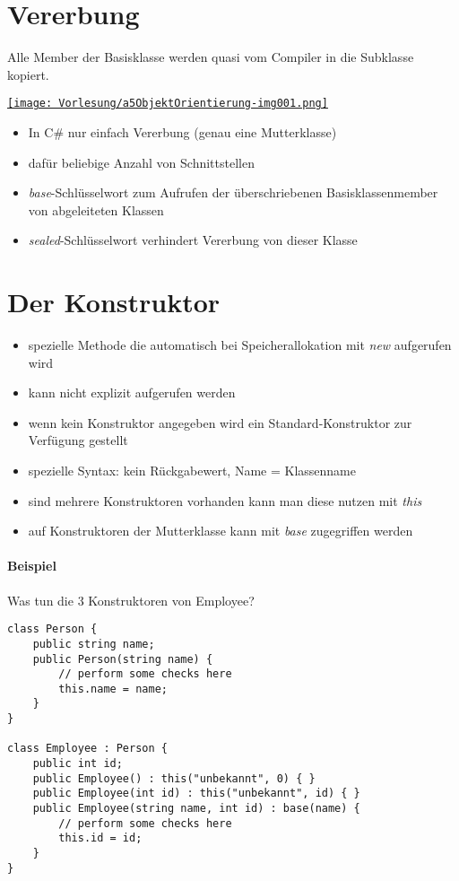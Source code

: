 \section{Vererbung}
Alle Member der Basisklasse werden quasi vom Compiler in die Subklasse kopiert.

\begin{center}
\href{https://commons.wikimedia.org/w/index.php?curid=6326887}{\texttt{[image: Vorlesung/a5ObjektOrientierung-img001.png]}}
\end{center}

\begin{itemize}
\item In C\# nur einfach Vererbung (genau eine Mutterklasse)
\item dafür beliebige Anzahl von Schnittstellen
\item \emph{base}-Schlüsselwort zum Aufrufen der überschriebenen Basisklassenmember von abgeleiteten Klassen
\item \emph{sealed}-Schlüsselwort verhindert Vererbung von dieser Klasse
\end{itemize}

\section{Der Konstruktor}

\begin{itemize}
\item spezielle Methode die automatisch bei Speicherallokation mit \emph{new} aufgerufen wird
\item kann nicht explizit aufgerufen werden
\item wenn kein Konstruktor angegeben wird ein Standard-Konstruktor zur Verfügung gestellt 
\item spezielle Syntax: kein Rückgabewert, Name = Klassenname
\end{itemize}\bigskip
\begin{itemize}
\item sind mehrere Konstruktoren vorhanden kann man diese nutzen mit \emph{this}
\item auf Konstruktoren der Mutterklasse kann mit \emph{base} zugegriffen werden
\end{itemize}

\paragraph{Beispiel} Was tun die 3 Konstruktoren von Employee? 
\begin{lstlisting}[language={[Sharp]C}]
class Person {
	public string name;
	public Person(string name) {
		// perform some checks here 
		this.name = name;
	}
}

class Employee : Person {
	public int id;
	public Employee() : this("unbekannt", 0) { }
	public Employee(int id) : this("unbekannt", id) { }  
	public Employee(string name, int id) : base(name) {
		// perform some checks here
		this.id = id;
	}
}
\end{lstlisting}

